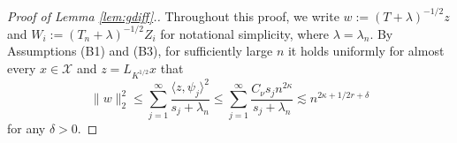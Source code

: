 \documentclass[11pt,a4paper]{article}
\theoremstyle{definition}
\theoremstyle{plain}
\theoremstyle{remark}
\newcommand{\mX}{\mathcal X}
\newcommand{\pd}[1]{
	{ \color{blue} PD: #1}
}
\begin{document}
\begin{proof}[Proof of Lemma \ref{lem:gdiff}.]
Throughout this proof, we write $w := (T+\lambda)^{-1/2} z$ and $W_i := (T_n+\lambda)^{-1/2}Z_i$ for notational simplicity, where $\lambda=\lambda_n$.
By Assumptions (B1) and (B3), for sufficiently large $n$ it holds uniformly for almost every $x\in\mX$ and $z=L_{K^{1/2}}x$ that
\begin{equation}
\|w\|_2^2 \leq \sum_{j=1}^{\infty} \frac{\langle z,\psi_j\rangle^2}{s_j+\lambda_n} \leq \sum_{j=1}^{\infty}\frac{C_\nu s_j n^{2\kappa}}{s_j+\lambda_n} \lesssim n^{2\kappa+1/2r+\delta}
\label{eq:proof-gdiff-0}
\end{equation}
for any $\delta>0$. 


\end{proof}
\end{document}
